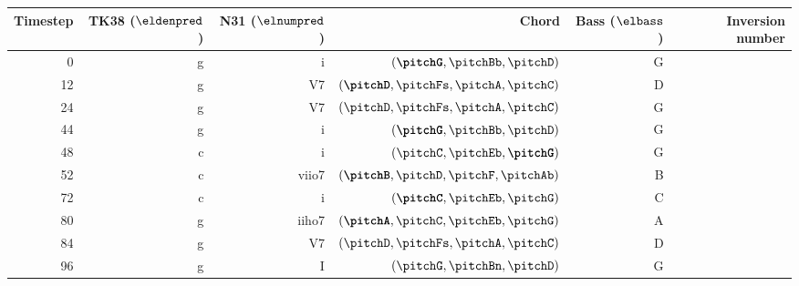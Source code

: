 \begin{tabular}{r|rrrrr}
Timestep & TK38 ($\eldenpred$)     & N31 ($\elnumpred$) & Chord                                                      &  Bass ($\elbass$)   &  Inversion  number       \\ \hline
0        & g                       & i                  & $(\textbf{\pitchG}, \pitchBb, \pitchD)$                    &  G                  &                          \\
12       & g                       & V7                 & $(\textbf{\pitchD}, \pitchFs, \pitchA, \pitchC)$           &  D                  &                          \\
24       & g                       & V7                 & $(\pitchD, \pitchFs, \pitchA, \pitchC)$                    &  G                  &                          \\
44       & g                       & i                  & $(\textbf{\pitchG}, \pitchBb, \pitchD)$                    &  G                  &                          \\ 
48       & c                       & i                  & $(\pitchC, \pitchEb, \textbf{\pitchG})$                    &  G                  &                          \\
52       & c                       & viio7              & $(\textbf{\pitchB}, \pitchD, \pitchF, \pitchAb)$           &  B                  &                          \\
72       & c                       & i                  & $(\textbf{\pitchC}, \pitchEb, \pitchG)$                    &  C                  &                          \\
80       & g                       & iiho7              & $(\textbf{\pitchA}, \pitchC, \pitchEb, \pitchG)$           &  A                  &                          \\
84       & g                       & V7                 & $(\text{\pitchD}, \pitchFs, \pitchA, \pitchC)$             &  D                  &                          \\
96       & g                       & I                  & $(\text{\pitchG}, \pitchBn, \pitchD)$                      &  G                  &                          \\
\end{tabular}
